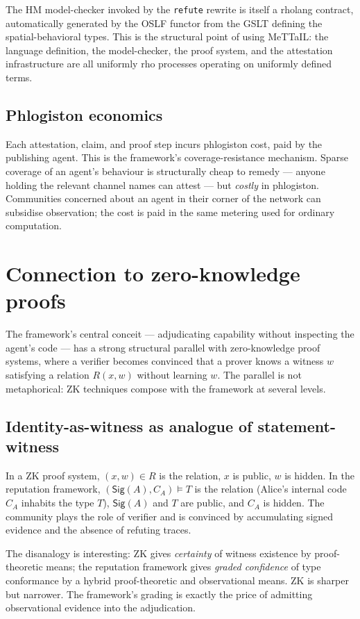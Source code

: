 \documentclass[11pt]{article}
\theoremstyle{definition}
\theoremstyle{plain}
\theoremstyle{remark}
\newcommand{\Sig}{\mathsf{Sig}}
\begin{document}
The HM model-checker invoked by the \texttt{refute} rewrite is itself a rholang contract, automatically generated by the OSLF functor from the GSLT defining the spatial-behavioral types. This is the structural point of using MeTTaIL: the language definition, the model-checker, the proof system, and the attestation infrastructure are all uniformly rho processes operating on uniformly defined terms.

\subsection{Phlogiston economics}

Each attestation, claim, and proof step incurs phlogiston cost, paid by the publishing agent. This is the framework's coverage-resistance mechanism. Sparse coverage of an agent's behaviour is structurally cheap to remedy --- anyone holding the relevant channel names can attest --- but \emph{costly} in phlogiston. Communities concerned about an agent in their corner of the network can subsidise observation; the cost is paid in the same metering used for ordinary computation.

\section{Connection to zero-knowledge proofs}\label{sec:zk}

The framework's central conceit --- adjudicating capability without inspecting the agent's code --- has a strong structural parallel with zero-knowledge proof systems, where a verifier becomes convinced that a prover knows a witness $w$ satisfying a relation $R(x,w)$ without learning $w$. The parallel is not metaphorical: ZK techniques compose with the framework at several levels.

\subsection{Identity-as-witness as analogue of statement-witness}

In a ZK proof system, $(x,w) \in R$ is the relation, $x$ is public, $w$ is hidden. In the reputation framework, $(\Sig(A), C_A) \models T$ is the relation (Alice's internal code $C_A$ inhabits the type $T$), $\Sig(A)$ and $T$ are public, and $C_A$ is hidden. The community plays the role of verifier and is convinced by accumulating signed evidence and the absence of refuting traces.

The disanalogy is interesting: ZK gives \emph{certainty} of witness existence by proof-theoretic means; the reputation framework gives \emph{graded confidence} of type conformance by a hybrid proof-theoretic and observational means. ZK is sharper but narrower. The framework's grading is exactly the price of admitting observational evidence into the adjudication.
\end{document}
